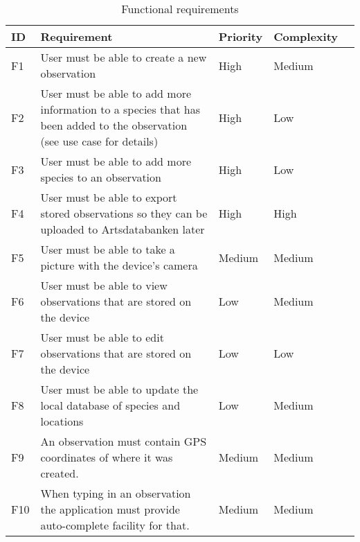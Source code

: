 \begin{table}[h!]
	\begin{tabular}[t]{|l|p{}|l|l|p{}|}\hline
	\bf ID&\bf Requirement& \bf Priority& \bf Complexity\\\hline
	F1&User must be able to create a new observation &High&Medium\\\hline
	F2&User must be able to add more information to a species that has been added to the observation (see use case for details) 	&High&Low\\\hline
	F3&User must be able to add more species to an observation &High&Low\\\hline
	F4&User must be able to export stored observations so they can be uploaded to Artsdatabanken later &High&High\\\hline
	F5&User must be able to take a picture with the device's camera &Medium&Medium\\\hline
	F6&User must be able to view observations that are stored on the device &Low&Medium\\\hline
	F7&User must be able to edit observations that are stored on the device &Low&Low\\\hline
	F8&User must be able to update the local database of species and locations &Low&Medium\\\hline
	F9&An observation must contain GPS coordinates of where it was created. &Medium&Medium\\\hline
	F10&When typing in an observation the application must provide auto-complete facility for that. &Medium&Medium\\\hline
	\end{tabular}
	\caption{Functional requirements}
	\label{funcreqs}
\end{table}
